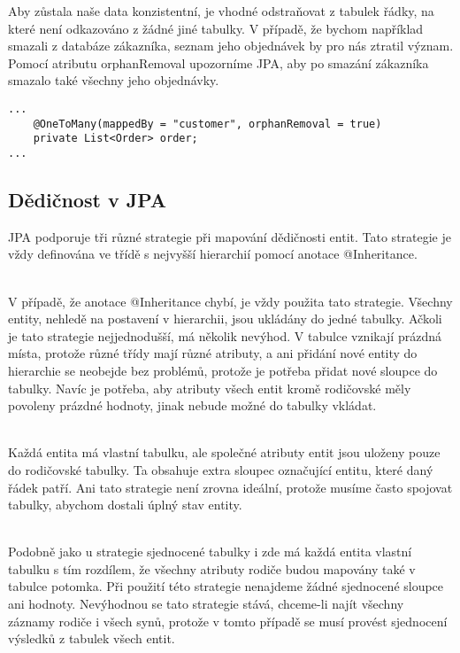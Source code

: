 \documentclass[122pt,oneside]{fithesis}
\begin{document}
Aby zůstala naše data konzistentní, je vhodné odstraňovat z tabulek řádky, na které není odkazováno z žádné jiné tabulky. V případě, že bychom například smazali z databáze zákazníka, seznam jeho objednávek by pro nás ztratil význam. Pomocí atributu orphanRemoval upozorníme JPA, aby po smazání zákazníka smazalo také všechny jeho objednávky.
\begin{lstlisting}
...
	@OneToMany(mappedBy = "customer", orphanRemoval = true)
	private List<Order> order;
...
\end{lstlisting}
\subsection{Dědičnost v JPA}
JPA podporuje tři různé strategie při mapování dědičnosti entit. Tato strategie je vždy definována ve třídě s nejvyšší hierarchií pomocí anotace @Inheritance.

\vspace{5 mm}
\\\indent V případě, že anotace @Inheritance chybí, je vždy použita tato strategie. Všechny entity, nehledě na postavení v hierarchii, jsou ukládány do jedné tabulky. Ačkoli je tato strategie nejjednodušší, má několik nevýhod. V tabulce vznikají prázdná místa, protože různé třídy mají různé atributy, a ani přidání nové entity do hierarchie se neobejde bez problémů, protože je potřeba přidat nové sloupce do tabulky. Navíc je potřeba, aby atributy všech entit kromě rodičovské měly povoleny prázdné hodnoty, jinak nebude možné do tabulky vkládat.

\vspace{5 mm}
\\\indent Každá entita má vlastní tabulku, ale společné atributy entit jsou uloženy pouze do rodičovské tabulky. Ta obsahuje extra sloupec označující entitu, které daný řádek patří. Ani tato strategie není zrovna ideální, protože musíme často spojovat tabulky, abychom dostali úplný stav entity.

\vspace{5 mm}
\\\indent Podobně jako u strategie sjednocené tabulky i zde má každá entita vlastní tabulku s tím rozdílem, že všechny atributy rodiče budou mapovány také v tabulce potomka. Při použití této strategie nenajdeme žádné sjednocené sloupce ani hodnoty. Nevýhodnou se tato strategie stává, chceme-li najít všechny záznamy rodiče i všech synů, protože v tomto případě se musí provést sjednocení výsledků z tabulek všech entit.
\end{document}
